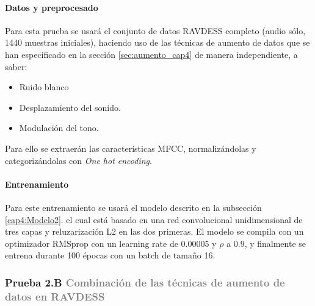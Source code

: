 \documentclass[11pt,a4paper,spanish]{book}
\begin{document}
	\hfill\begin{minipage}[t]{\dimexpr\textwidth-1cm}
		\paragraph{Datos y preprocesado}Para esta prueba se usará el conjunto de datos RAVDESS completo (audio sólo, 1440 muestras iniciales), haciendo uso de las técnicas de aumento de datos que se han especificado en la sección \ref{sec:aumento_cap4} de manera independiente, a saber:
		\begin{itemize}
			\item Ruido blanco
			\item Desplazamiento del sonido.
			\item Modulación del tono.
		\end{itemize}
		Para ello se extraerán las características MFCC, normalizándolas y categorizándolas con \emph{One hot encoding}.
		
		\paragraph{Entrenamiento}Para este entrenamiento se usará el modelo descrito en la subsección \ref{cap4:Modelo2}. el cual está basado en una red convolucional unidimensional de tres capas y reluzarización L2 en las dos primeras.
		El modelo se compila con un optimizador RMSprop con un learning rate de 0.00005 y $\rho$ a 0.9, y finalmente se entrena durante 100 épocas con un batch de tamaño 16.\\

	\end{minipage}
	
	\subsubsection[]{\large Prueba 2.B {\normalsize \textcolor{Gray}{Combinación de las técnicas de aumento de datos en RAVDESS}}}
	
\end{document}
